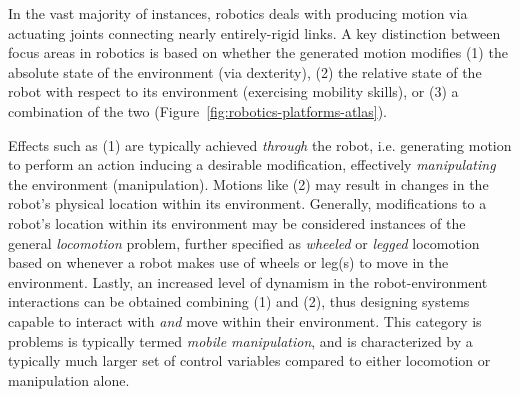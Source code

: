 In the vast majority of instances, robotics deals with producing motion via actuating joints connecting nearly entirely-rigid links.
A key distinction between focus areas in robotics is based on whether the generated motion modifies (1) the absolute state of the environment (via dexterity), (2) the relative state of the robot with respect to its environment (exercising mobility skills), or (3) a combination of the two (Figure~\ref{fig:robotics-platforms-atlas}).

Effects such as (1) are typically achieved \emph{through} the robot, i.e. generating motion to perform an action inducing a desirable modification, effectively \emph{manipulating} the environment (manipulation).
Motions like (2) may result in changes in the robot's physical location within its environment.
Generally, modifications to a robot's location within its environment may be considered instances of the general \emph{locomotion} problem, further specified as \emph{wheeled} or \emph{legged} locomotion based on whenever a robot makes use of wheels or leg(s) to move in the environment.
Lastly, an increased level of dynamism in the robot-environment interactions can be obtained combining (1) and (2), thus designing systems capable to interact with \emph{and} move within their environment.
This category is problems is typically termed \emph{mobile manipulation}, and is characterized by a typically much larger set of control variables compared to either locomotion or manipulation alone.

